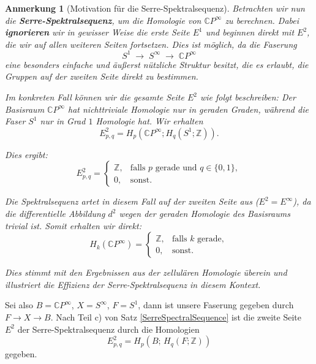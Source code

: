 \documentclass[12pt]{article}
\numberwithin{conj}{section}
\newtheorem{remark}[conj]{Anmerkung}
\begin{document}
    \begin{remark}[Motivation für die Serre-Spektralsequenz]
    Betrachten wir nun die \textbf{Serre-Spektralsequenz}, um die Homologie von $\mathbb{C}
    P^{\infty}$ zu berechnen. Dabei \textbf{ignorieren} wir in gewisser Weise die erste
    Seite $E^{1}$ und beginnen direkt mit $E^{2}$, die wir auf allen weiteren
    Seiten fortsetzen. Dies ist möglich, da die Faserung
    \[
        S^{1} \;\longrightarrow\; S^{\infty} \;\longrightarrow\; \mathbb{C}P^{\infty}
    \]
    eine besonders einfache und äußerst nützliche Struktur besitzt, die es erlaubt,
    die Gruppen auf der zweiten Seite direkt zu bestimmen.

    Im konkreten Fall können wir die gesamte Seite $E^{2}$ wie folgt beschreiben: Der Basisraum $\mathbb{C}P^{\infty}$ hat nichttriviale Homologie nur in geraden Graden,
    während die Faser $S^{1}$ nur in Grad $1$ Homologie hat. Wir erhalten
    \[
        E^{2}_{p,q} = H_{p}(\mathbb{C}P^{\infty}; H_{q}(S^{1};\mathbb{Z})
        ).
    \]

    Dies ergibt:
    \[
        E^{2}_{p,q}=
        \begin{cases}
            \mathbb{Z}, & \text{falls } p \text{ gerade und } q \in \{0,1\}, \\
            0,          & \text{sonst}.
        \end{cases}
    \]

    Die Spektralsequenz artet in diesem Fall auf der zweiten Seite aus ($E^{2} =
    E^{\infty}$), da die differentielle Abbildung $d^{2}$ wegen der geraden
    Homologie des Basisraums trivial ist. Somit erhalten wir direkt:
    \[
        H_{k}(\mathbb{C}P^{\infty}) =
        \begin{cases}
            \mathbb{Z}, & \text{falls } k \text{ gerade}, \\
            0,          & \text{sonst}.
        \end{cases}
    \]

    Dies stimmt mit den Ergebnissen aus der zellulären Homologie überein und illustriert
    die Effizienz der Serre-Spektralsequenz in diesem Kontext.
    \end{remark}

    Sei also $B = \mathbb{C}P^{\infty}$, $X = S^{\infty}$, $F = S^{1}$, dann ist
    unsere Faserung gegeben durch $F \to X \to B$. Nach Teil c) von Satz
    \ref{SerreSpectralSequence} ist die zweite Seite $E^{2}$ der Serre-Spektralsequenz
    durch die Homologien
    \[
        E^{2}_{p,q}= H_{p}(B;\, H_{q}(F;\mathbb{Z}))
    \]
    gegeben.
\end{document}
